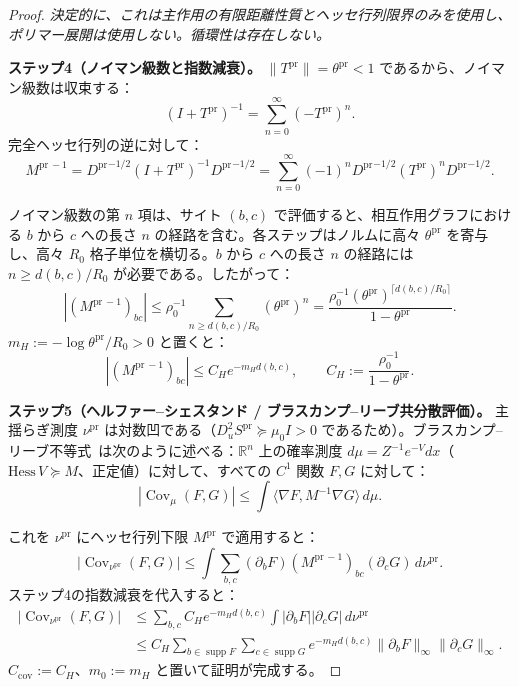 \documentclass[12pt]{article}
\theoremstyle{plain}
\theoremstyle{definition}
\numberwithin{equation}{section}
\newcommand{\R}{\mathbb{R}}
\newcommand{\Cov}{\operatorname{Cov}}
\newcommand{\supp}{\operatorname{supp}}
\newcommand{\pr}{\mathrm{pr}}
\begin{document}
\begin{proof}
\emph{決定的に、これは主作用の有限距離性質とヘッセ行列限界のみを使用し、ポリマー展開は使用しない。循環性は存在しない。}

\textbf{ステップ4（ノイマン級数と指数減衰）。}
$\|T^{\pr}\|=\theta^{\pr}<1$ であるから、ノイマン級数は収束する：
\begin{equation}
(I+T^{\pr})^{-1} = \sum_{n=0}^\infty(-T^{\pr})^n.
\end{equation}
完全ヘッセ行列の逆に対して：
\begin{equation}
M^{\pr\,-1} = {D^{\pr}}^{-1/2}(I+T^{\pr})^{-1}{D^{\pr}}^{-1/2} = \sum_{n=0}^\infty(-1)^n{D^{\pr}}^{-1/2}(T^{\pr})^n{D^{\pr}}^{-1/2}.
\end{equation}

ノイマン級数の第 $n$ 項は、サイト $(b,c)$ で評価すると、相互作用グラフにおける $b$ から $c$ への長さ $n$ の経路を含む。各ステップはノルムに高々 $\theta^{\pr}$ を寄与し、高々 $R_0$ 格子単位を横切る。$b$ から $c$ への長さ $n$ の経路には $n\geq d(b,c)/R_0$ が必要である。したがって：
\begin{equation}
|(M^{\pr\,-1})_{bc}| \leq \rho_0^{-1}\sum_{n\geq d(b,c)/R_0}(\theta^{\pr})^n = \frac{\rho_0^{-1}(\theta^{\pr})^{\lceil d(b,c)/R_0\rceil}}{1-\theta^{\pr}}.
\end{equation}
$m_H:=-\log\theta^{\pr}/R_0>0$ と置くと：
\begin{equation}
\boxed{|(M^{\pr\,-1})_{bc}| \leq C_H e^{-m_H d(b,c)},\qquad C_H:=\frac{\rho_0^{-1}}{1-\theta^{\pr}}.}
\end{equation}

\textbf{ステップ5（ヘルファー--シェスタンド / ブラスカンプ--リーブ共分散評価）。}
主揺らぎ測度 $\nu^{\pr}$ は対数凹である（$D_u^2 S^{\pr}\succeq\mu_0 I>0$ であるため）。ブラスカンプ--リーブ不等式~\cite{BrascampLieb}は次のように述べる：$\R^n$ 上の確率測度 $d\mu=Z^{-1}e^{-V}dx$（$\mathrm{Hess}\,V\succeq M$、正定値）に対して、すべての $C^1$ 関数 $F,G$ に対して：
\begin{equation}
|\Cov_\mu(F,G)| \leq \int\langle\nabla F,M^{-1}\nabla G\rangle\,d\mu.
\end{equation}

これを $\nu^{\pr}$ にヘッセ行列下限 $M^{\pr}$ で適用すると：
\begin{equation}
|\Cov_{\nu^{\pr}}(F,G)| \leq \int\sum_{b,c}(\partial_b F)(M^{\pr\,-1})_{bc}(\partial_c G)\,d\nu^{\pr}.
\end{equation}
ステップ4の指数減衰を代入すると：
\begin{align}
|\Cov_{\nu^{\pr}}(F,G)| &\leq \sum_{b,c}C_H e^{-m_H d(b,c)}\int|\partial_b F||\partial_c G|\,d\nu^{\pr}\\
&\leq C_H\sum_{b\in\supp F}\sum_{c\in\supp G}e^{-m_H d(b,c)}\|\partial_b F\|_\infty\|\partial_c G\|_\infty.
\end{align}
$C_{\mathrm{cov}}:=C_H$、$m_0:=m_H$ と置いて証明が完成する。
\end{proof}
\end{document}
